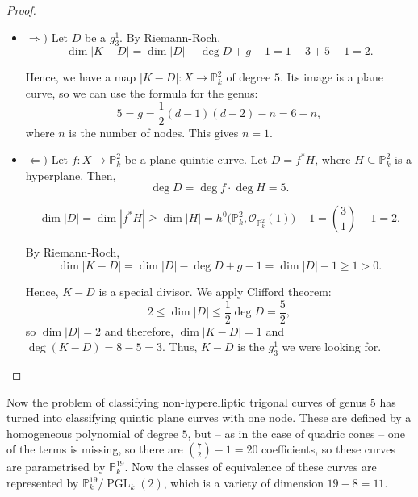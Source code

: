 \documentclass[12pt]{article}
\theoremstyle{definition}
\DeclareMathOperator{\PGL}{PGL}
\begin{document}
\begin{proof}
\begin{itemize}
\item $\Rightarrow)$ Let $D$ be a $g_3^1$. By Riemann-Roch,
\[\dim|K-D|=\dim|D|-\deg D+g-1=1-3+5-1=2.\]

Hence, we have a map $|K-D|:X\rightarrow\mathbb{P}_k^2$ of degree $5$. Its image is a plane curve, so we can use the formula for the genus:
\[5=g=\frac{1}{2}(d-1)(d-2)-n=6-n,\]
where $n$ is the number of nodes. This gives $n=1$.

\item $\Leftarrow)$ Let $f:X\rightarrow\mathbb{P}_k^2$ be a plane quintic curve. Let $D=f^*H$, where $H\subseteq\mathbb{P}_k^2$ is a hyperplane. Then,
\[\deg D=\deg f\cdot\deg H=5.\]

\[\dim|D|=\dim|f^*H|\geq\dim|H|=h^0\big(\mathbb{P}_k^2,\mathcal{O}_{\mathbb{P}_k^2}(1)\big)-1=\binom{3}{1}-1=2.\]

By Riemann-Roch,
\[\dim|K-D|=\dim|D|-\deg D+g-1=\dim|D|-1\geq1>0.\]

Hence, $K-D$ is a special divisor. We apply Clifford theorem:
\[2\leq\dim|D|\leq\frac{1}{2}\deg D=\frac{5}{2},\]
so $\dim|D|=2$ and therefore, $\dim|K-D|=1$ and $\deg(K-D)=8-5=3$. Thus, $K-D$ is the $g_3^1$ we were looking for.
\end{itemize}
\end{proof}

Now the problem of classifying non-hyperelliptic trigonal curves of genus $5$ has turned into classifying quintic plane curves with one node. These are defined by a homogeneous polynomial of degree $5$, but -- as in the case of quadric cones -- one of the terms is missing, so there are $\binom{7}{2}-1=20$ coefficients, so these curves are parametrised by $\mathbb{P}_k^{19}$. Now the classes of equivalence of these curves are represented by $\mathbb{P}_k^{19}/\PGL_k(2)$, which is a variety of dimension $19-8=11$.
\end{document}
